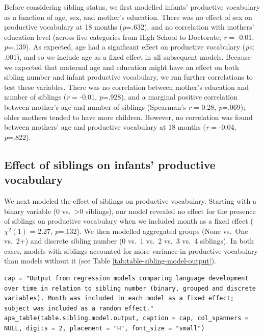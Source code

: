 \documentclass[
  english,
  man,floatsintext]{apa6}
\begin{document}
Before considering sibling status, we first modelled infants' productive vocabulary as a function of age, sex, and mother's education. There was no effect of sex on productive vocabulary at 18 months (\emph{p}=.632), and no correlation with mothers' education level (across five categories from High School to Doctorate; \emph{r} = -0.01, \emph{p}=.139). As expected, age had a significant effect on productive vocabulary (\emph{p}\textless{} .001), and so we include age as a fixed effect in all subsequent models. Because we expected that maternal age and education might have an effect on both sibling number and infant productive vocabulary, we ran further correlations to test these variables. There was no correlation between mother's education and number of siblings (\emph{r} = -0.01, \emph{p}=.928), and a marginal positive correlation between mother's age and number of siblings (Spearman's \emph{r} = 0.28, \emph{p}=.069); older mothers tended to have more children. However, no correlation was found between mothers' age and productive vocabulary at 18 months (\emph{r} = -0.04, \emph{p}=.822).

\hypertarget{effect-of-siblings-on-infants-productive-vocabulary}{%
\subsection{Effect of siblings on infants' productive vocabulary}\label{effect-of-siblings-on-infants-productive-vocabulary}}

We next modeled the effect of siblings on productive vocabulary. Starting with a binary variable (0 vs.~\textgreater0 siblings), our model revealed no effect for the presence of siblings on productive vocabulary when we included month as a fixed effect (\(\chi^2 (1)\) = 2.27, \emph{p}=.132). We then modelled aggregated groups (None vs.~One vs.~2+) and discrete sibling number (0 vs.~1 vs.~2 vs.~3 vs.~4 siblings). In both cases, models with siblings accounted for more variance in productive vocabulary than models without it (see Table \ref{tab:table-sibling-model-output}).

\begin{verbatim}
cap = "Output from regression models comparing language development over time in relation to sibling number (binary, grouped and discrete variables). Month was included in each model as a fixed effect; subject was included as a random effect."
apa_table(table.sibling.model.output, caption = cap, col_spanners = NULL, digits = 2, placement = "H", font_size = "small")
\end{verbatim}
\end{document}
